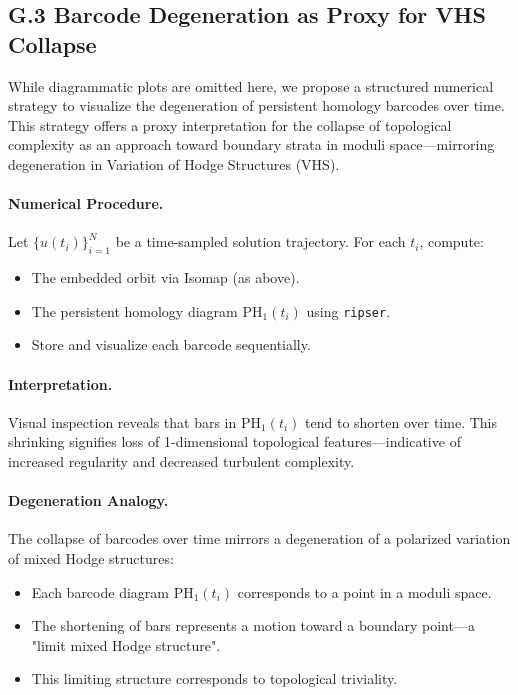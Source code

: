\documentclass[11pt]{article}
\theoremstyle{definition}
\begin{document}
\subsection*{G.3 Barcode Degeneration as Proxy for VHS Collapse}

While diagrammatic plots are omitted here, we propose a structured numerical strategy to visualize the degeneration of persistent homology barcodes over time. This strategy offers a proxy interpretation for the collapse of topological complexity as an approach toward boundary strata in moduli space---mirroring degeneration in Variation of Hodge Structures (VHS).

\paragraph{Numerical Procedure.} Let \( \{u(t_i)\}_{i=1}^N \) be a time-sampled solution trajectory. For each \( t_i \), compute:
\begin{itemize}
  \item The embedded orbit via Isomap (as above).
  \item The persistent homology diagram \( \mathrm{PH}_1(t_i) \) using \texttt{ripser}.
  \item Store and visualize each barcode sequentially.
\end{itemize}

\paragraph{Interpretation.} Visual inspection reveals that bars in \( \mathrm{PH}_1(t_i) \) tend to shorten over time. This shrinking signifies loss of 1-dimensional topological features---indicative of increased regularity and decreased turbulent complexity.

\paragraph{Degeneration Analogy.} The collapse of barcodes over time mirrors a degeneration of a polarized variation of mixed Hodge structures:
\begin{itemize}
  \item Each barcode diagram \( \mathrm{PH}_1(t_i) \) corresponds to a point in a moduli space.
  \item The shortening of bars represents a motion toward a boundary point---a "limit mixed Hodge structure".
  \item This limiting structure corresponds to topological triviality.
\end{itemize}
\end{document}
